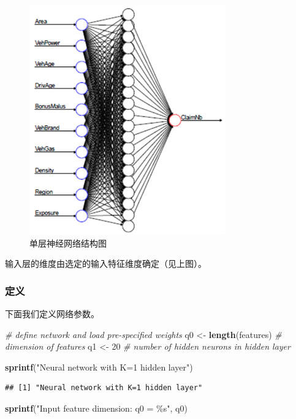 \documentclass[
]{article}
\newenvironment{Shaded}{\begin{snugshade}}{\end{snugshade}}
\newcommand{\CommentTok}[1]{\textcolor[rgb]{0.56,0.35,0.01}{\textit{#1}}}
\newcommand{\DecValTok}[1]{\textcolor[rgb]{0.00,0.00,0.81}{#1}}
\newcommand{\FunctionTok}[1]{\textcolor[rgb]{0.13,0.29,0.53}{\textbf{#1}}}
\newcommand{\NormalTok}[1]{#1}
\newcommand{\OtherTok}[1]{\textcolor[rgb]{0.56,0.35,0.01}{#1}}
\newcommand{\StringTok}[1]{\textcolor[rgb]{0.31,0.60,0.02}{#1}}
\begin{document}
\begin{figure}
\centering
\includegraphics{./Figs/Case2/Case2-Fig2.png}
\caption{单层神经网络结构图}
\end{figure}

输入层的维度由选定的输入特征维度确定（见上图）。

\subsubsection{定义}\label{ux5b9aux4e49-1}

下面我们定义网络参数。

\begin{Shaded}
\begin{Highlighting}[]
\CommentTok{\# define network and load pre{-}specified weights}
\NormalTok{q0 }\OtherTok{\textless{}{-}} \FunctionTok{length}\NormalTok{(features)                  }\CommentTok{\# dimension of features}
\NormalTok{q1 }\OtherTok{\textless{}{-}} \DecValTok{20}                                \CommentTok{\# number of hidden neurons in hidden layer}

\FunctionTok{sprintf}\NormalTok{(}\StringTok{"Neural network with K=1 hidden layer"}\NormalTok{)}
\end{Highlighting}
\end{Shaded}

\begin{verbatim}
## [1] "Neural network with K=1 hidden layer"
\end{verbatim}

\begin{Shaded}
\begin{Highlighting}[]
\FunctionTok{sprintf}\NormalTok{(}\StringTok{"Input feature dimension: q0 = \%s"}\NormalTok{, q0)}
\end{Highlighting}
\end{Shaded}
\end{document}
